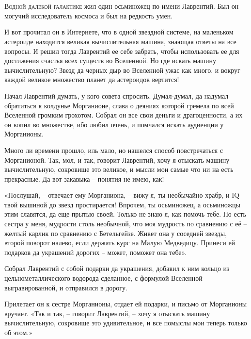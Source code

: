\documentclass[ebook,oneside,final,openright]{memoir}
\begin{document}
\chapter{}
 \lettrine{В}{одной далекой галактике} жил один осьминожец по имени Лаврентий. Был он могучий исследователь космоса и был на редкость умен.\par
\par
И вот прочитал он в Интернете, что в одной звездной системе, на маленьком астероиде находится великая вычислительная машина, знающая ответы на все вопросы. И решил тогда Лаврентий ее себе забрать, чтобы использовать ее для достижения счастья всех существ во Вселенной. Но где искать машину вычислительную? Звезд да черных дыр во Вселенной ужас как много, и вокруг каждой великое множество планет да астероидов вертится!\par
\par
Начал Лаврентий думать, у кого совета спросить. Думал-думал, да надумал обратиться к колдунье Морганионе, слава о деяниях которой гремела по всей Вселенной громким грохотом. Собрал он все свои деньги и драгоценности, а их он копил во множестве, ибо любил очень, и помчался искать аудиенции у Морганионы.\par
\par
Много ли времени прошло, иль мало, но нашелся способ повстречаться с Морганионой. Так, мол, и так, говорит Лаврентий, хочу я отыскать машину вычислительную, сокровище это великое, и мысли мои самые что ни на есть прекрасные. Да вот закавыка – понятия не имею, как!\par
\par
«Послушай, – отвечает ему Морганиона, – вижу я, ты необычайно храбр, и IQ твой вышиной до звезд простирается! Впрочем, ты осьминожец, а осьминожцы этим славятся, да еще прытью своей. Только не знаю я, как помочь тебе. Но есть сестра у меня, мудрости столь необычной, что моя мудрость по сравнению с её – желтый карлик по сравнению с Бетельгейзе. Живет она у соседней звезды, второй поворот налево, если держать курс на Малую Медведицу. Принеси ей подарков да украшений дорогих – может, поможет она тебе».\par
\par
Собрал Лаврентий с собой подарки да украшения, добавил к ним кольцо из цельнометаллического водорода сделанное, с формулой Вселенной выгравированной, и отправился в дорогу.\par
\par
Прилетает он к сестре Морганионы, отдает ей подарки, и письмо от Морганионы вручает. «Так и так, – говорит Лаврентий, – хочу я отыскать машину вычислительную, сокровище это удивительное, и все помыслы мои теперь только об этом.»\par
\end{document}
